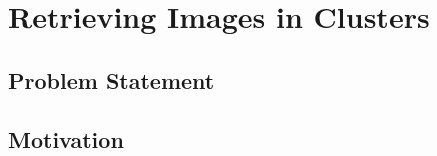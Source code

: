\section{Retrieving Images in Clusters}
\label{sec_introduction}


\subsection{Problem Statement}


\subsection{Motivation}

